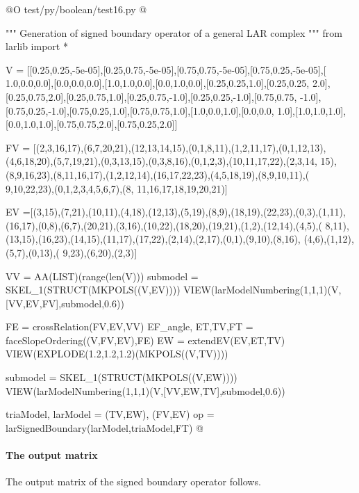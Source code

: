 \documentclass[11pt,oneside]{article}    %
\begin{document}
@O test/py/boolean/test16.py
@{""" Generation of signed boundary operator of a general LAR complex """
from larlib import *

V = [[0.25,0.25,-5e-05],[0.25,0.75,-5e-05],[0.75,0.75,-5e-05],[0.75,0.25,-5e-05],[
1.0,0.0,0.0],[0.0,0.0,0.0],[1.0,1.0,0.0],[0.0,1.0,0.0],[0.25,0.25,1.0],[0.25,0.25,
2.0],[0.25,0.75,2.0],[0.25,0.75,1.0],[0.25,0.75,-1.0],[0.25,0.25,-1.0],[0.75,0.75,
-1.0],[0.75,0.25,-1.0],[0.75,0.25,1.0],[0.75,0.75,1.0],[1.0,0.0,1.0],[0.0,0.0,
1.0],[1.0,1.0,1.0],[0.0,1.0,1.0],[0.75,0.75,2.0],[0.75,0.25,2.0]]

FV = [(2,3,16,17),(6,7,20,21),(12,13,14,15),(0,1,8,11),(1,2,11,17),(0,1,12,13),
(4,6,18,20),(5,7,19,21),(0,3,13,15),(0,3,8,16),(0,1,2,3),(10,11,17,22),(2,3,14,
15),(8,9,16,23),(8,11,16,17),(1,2,12,14),(16,17,22,23),(4,5,18,19),(8,9,10,11),(
9,10,22,23),(0,1,2,3,4,5,6,7),(8, 11,16,17,18,19,20,21)]

EV =[(3,15),(7,21),(10,11),(4,18),(12,13),(5,19),(8,9),(18,19),(22,23),(0,3),(1,11),
(16,17),(0,8),(6,7),(20,21),(3,16),(10,22),(18,20),(19,21),(1,2),(12,14),(4,5),(
8,11),(13,15),(16,23),(14,15),(11,17),(17,22),(2,14),(2,17),(0,1),(9,10),(8,16),
(4,6),(1,12),(5,7),(0,13),( 9,23),(6,20),(2,3)]

VV = AA(LIST)(range(len(V)))
submodel = SKEL_1(STRUCT(MKPOLS((V,EV))))
VIEW(larModelNumbering(1,1,1)(V,[VV,EV,FV],submodel,0.6))

FE = crossRelation(FV,EV,VV)
EF_angle, ET,TV,FT = faceSlopeOrdering((V,FV,EV),FE)
EW = extendEV(EV,ET,TV)
VIEW(EXPLODE(1.2,1.2,1.2)(MKPOLS((V,TV))))
            
submodel = SKEL_1(STRUCT(MKPOLS((V,EW))))
VIEW(larModelNumbering(1,1,1)(V,[VV,EW,TV],submodel,0.6))

triaModel, larModel = (TV,EW), (FV,EV)
op = larSignedBoundary(larModel,triaModel,FT)
@}

\paragraph{The output matrix}
The output matrix of the signed boundary operator follows.
\end{document}
